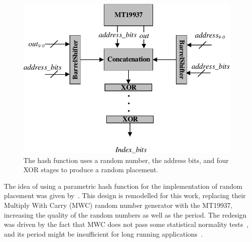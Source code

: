 \label{PHF}


\begin{figure}[t!]

 \centering
  \captionsetup{justification=centering}    
   \includegraphics[scale=0.8]{figures/img/hash_function.pdf}
   \caption{The hash function uses a random number, the address bits, and four XOR stages to produce a random placement.}
\label{fig:hash_function}
\end{figure}




The idea of using a parametric hash function for the implementation of
random placement was given
by~\cite{Kosmidis:2013:CDP:2485288.2485416}. This design is remodelled
for this work, replacing their Multiply With Carry (MWC) random number
generator with the MT19937, increasing the quality of the random
numbers as well as the period.  The redesign was driven by the fact
that MWC does not pass some statistical normality
tests~\cite{bandyopadhyay2015discrete}, and its period might be
insufficient for long running
applications~\cite{Goresky:2003:EMR:945511.945514}.

